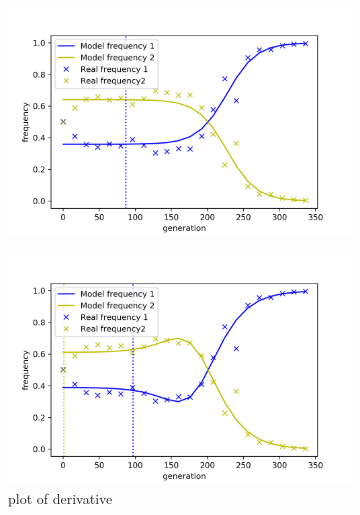 \documentclass{article}
\begin{document}
\begin{figure}[h]
	\centering
	\begin{subfigure}[t]{0.30\linewidth}
		\centering
		\includegraphics[width = 1.0\linewidth, trim={0 0 0 0}, clip=true]{fit_mut1.png}
		\label{fig:mut1}	
	\end{subfigure}%
	\hspace{0.03\linewidth}
	\begin{subfigure}[t]{0.30\linewidth}
		\centering
		\includegraphics[width = 1.0\linewidth, trim={0 0 0 0}, clip=true]{fit_mut2.png}
		\caption{plot of derivative}
		\label{fig:mut2}
	\end{subfigure}
	\hspace{0.03\linewidth}
	\begin{subfigure}[t]{0.30\linewidth}
		\centering

\end{subfigure}
\end{figure}
\end{document}
